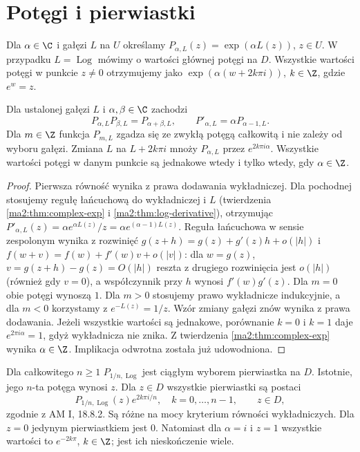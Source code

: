 \section{Potęgi i pierwiastki}

\begin{definicja}
\label{ma2:def:complex-power}
Dla $\alpha\in\C$ i gałęzi $L$ na $U$ określamy
$P_{\alpha,L}(z)=\exp(\alpha L(z))$, $z\in U$.
W przypadku $L=\operatorname{Log}$ mówimy o wartości głównej
potęgi na $D$. Wszystkie wartości potęgi w punkcie $z\ne0$
otrzymujemy jako $\exp(\alpha(w+2k\pi i))$, $k\in\Z$,
gdzie $e^w=z$.
\end{definicja}

\begin{twierdzenie}
\label{ma2:thm:complex-power}
Dla ustalonej gałęzi $L$ i $\alpha,\beta\in\C$ zachodzi
\[
 P_{\alpha,L}P_{\beta,L}=P_{\alpha+\beta,L},\qquad
 P'_{\alpha,L}=\alpha P_{\alpha-1,L}.
\]
Dla $m\in\Z$ funkcja $P_{m,L}$ zgadza się ze zwykłą
potęgą całkowitą i nie zależy od wyboru gałęzi.
Zmiana $L$ na $L+2k\pi i$ mnoży $P_{\alpha,L}$ przez
$e^{2k\pi i\alpha}$. Wszystkie wartości potęgi w danym
punkcie są jednakowe wtedy i tylko wtedy, gdy $\alpha\in\Z$.
\end{twierdzenie}
\begin{proof}
Pierwsza równość wynika z prawa dodawania wykładniczej.
Dla pochodnej stosujemy regułę łańcuchową do wykładniczej
i $L$ (twierdzenia \ref{ma2:thm:complex-exp}
i \ref{ma2:thm:log-derivative}), otrzymując
$P'_{\alpha,L}(z)=\alpha e^{\alpha L(z)}/z
=\alpha e^{(\alpha-1)L(z)}$. Reguła łańcuchowa w sensie
zespolonym wynika z rozwinięć
$g(z+h)=g(z)+g'(z)h+o(|h|)$ i
$f(w+v)=f(w)+f'(w)v+o(|v|)$:
dla $w=g(z)$, $v=g(z+h)-g(z)=O(|h|)$
reszta z drugiego rozwinięcia jest $o(|h|)$ (również
gdy $v=0$), a współczynnik przy $h$ wynosi $f'(w)g'(z)$.
Dla $m=0$ obie potęgi wynoszą $1$. Dla $m>0$
stosujemy prawo wykładnicze indukcyjnie,
a dla $m<0$ korzystamy z $e^{-L(z)}=1/z$.
Wzór zmiany gałęzi znów wynika z prawa dodawania.
Jeżeli wszystkie wartości są jednakowe, porównanie
$k=0$ i $k=1$ daje $e^{2\pi i\alpha}=1$, gdyż
wykładnicza nie znika. Z twierdzenia
\ref{ma2:thm:complex-exp} wynika $\alpha\in\Z$.
Implikacja odwrotna została już udowodniona.
\end{proof}

\begin{przyklad}
Dla całkowitego $n\ge1$ $P_{1/n,\operatorname{Log}}$
jest ciągłym wyborem pierwiastka na $D$. Istotnie,
jego $n$-ta potęga wynosi $z$. Dla $z\in D$ wszystkie pierwiastki są postaci
\[
 P_{1/n,\operatorname{Log}}(z)e^{2k\pi i/n},\quad
 k=0,\ldots,n-1,\qquad z\in D,
\]
zgodnie z AM I, 18.8.2. Są różne na mocy kryterium
równości wykładniczych. Dla $z=0$ jedynym pierwiastkiem
jest $0$. Natomiast dla $\alpha=i$ i $z=1$ wszystkie
wartości to $e^{-2k\pi}$, $k\in\Z$; jest ich nieskończenie wiele.
\end{przyklad}

